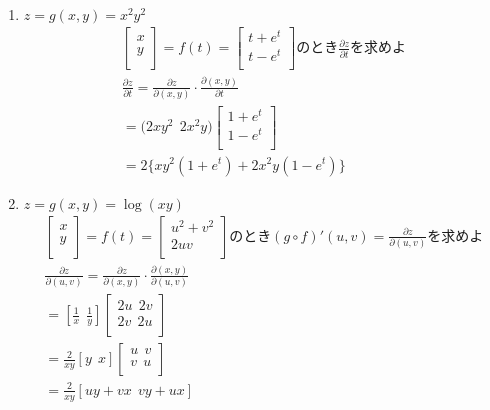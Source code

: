\documentclass[a4paper,10pt]{jarticle}
\begin{document}
\section{}
\begin{enumerate}
\item $z = g(x,y) = x^2y^2$\begin{gather*}
 	\left[    \begin{array}{r}
		x \\
		y \\
	\end{array}  \right]
	= f(t) = 
 	\left[    \begin{array}{r}
		t+e^t \\
		t-e^t \\
	\end{array}  \right]
	\text{のとき}\frac{\partial z}{\partial t}\text{を求めよ} \\
	\frac{\partial z}{\partial t} = \frac{\partial z}{\partial(x,y)} \cdot \frac{\partial(x,y)}{\partial t} \\
	=\big(2xy^2 \ \ 2x^2y\big) 
 	\left[    \begin{array}{r}
		1+e^t \\
		1-e^t \\
	\end{array}  \right] \\
	= 2\{xy^2(1+e^t) + 2x^2y(1-e^t)\}
\end{gather*}
\item$ z = g(x,y) = \log(xy) $\begin{gather*}
 	\left[    \begin{array}{r}
		x \\
		y \\
	\end{array}  \right]
	= f(t) = 
 	\left[    \begin{array}{r}
		u^2+v^2 \\
		2uv \\	\end{array}  \right]
	\text{のとき}(g \circ f)' (u,v) = \frac{\partial z}{\partial(u,v)}\text{を求めよ} \\
	\frac{\partial z}{\partial(u,v)} = \frac{\partial z}{\partial(x,y)} \cdot \frac{\partial(x,y)}{\partial(u,v)}\\
	=\left[\frac{1}{x}\ \ \frac{1}{y}\right]
	\left[    \begin{array}{rr}
		2u \ \ 2v \\
		2v \ \ 2u \\
	\end{array}  \right] \\
	=\frac{2}{xy}\left[y\ \ x\right]
	\left[    \begin{array}{rr}
		u \ \ v \\
		v \ \ u \\
	\end{array}  \right] \\
	=\frac{2}{xy}\left[uy+vx\ \ vy+ux\right]
\end{gather*}
\end{enumerate}
\end{document}
